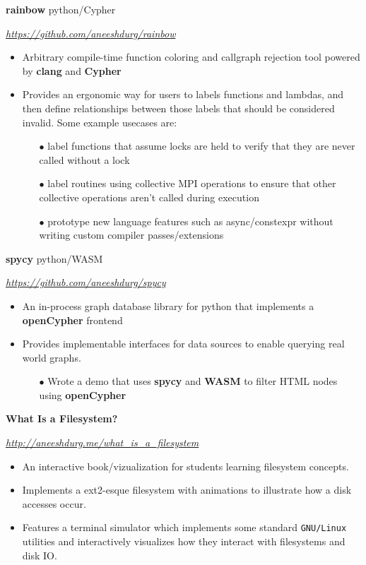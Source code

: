 \documentclass[paper=a4,fontsize=11pt]{scrartcl} %
\newcommand{\EducationEntry}[4]{
		\noindent \textbf{#1}     %
			\hfill#2 \par  %
		\noindent \textit{#3} \par        %
		\noindent\hangafter=0 \small #4 %
		\normalsize \par}
\begin{document}
\EducationEntry{rainbow}{python/Cypher}{\url{https://github.com/aneeshdurg/rainbow}}{
\begin{itemize}
  \item Arbitrary compile-time function coloring and callgraph rejection tool powered by \textbf{clang} and \textbf{Cypher}
\item Provides an ergonomic way for users to labels functions and lambdas, and then define relationships between those labels that should be considered invalid. Some example usecases are:
  \begin{itemize}
    \item[$\bullet$] label functions that assume locks are held to verify that they are never called without a lock
    \item[$\bullet$] label routines using collective MPI operations to ensure that other collective operations aren't called during execution
    \item[$\bullet$] prototype new language features such as async/constexpr without writing custom compiler passes/extensions
  \end{itemize}
\end{itemize}
}

\EducationEntry{spycy}{python/WASM}{\url{https://github.com/aneeshdurg/spycy}}{
\begin{itemize}
  \item An in-process graph database library for python that implements a \textbf{openCypher} frontend
  \item Provides implementable interfaces for data sources to enable querying real world graphs.
  \begin{itemize}
    \item[$\bullet$] Wrote a demo that uses \textbf{spycy} and \textbf{WASM} to filter HTML nodes using \textbf{openCypher}
  \end{itemize}
\end{itemize}
}

\EducationEntry{What Is a Filesystem?}{}{\url{http://aneeshdurg.me/what_is_a_filesystem}}{
\begin{itemize}
\item An interactive book/vizualization for students learning filesystem concepts.
\item Implements a ext2-esque filesystem with animations to illustrate how a disk accesses occur.
\item Features a terminal simulator which implements some standard \texttt{GNU/Linux} utilities and interactively visualizes how they interact with filesystems and disk IO.%
\end{itemize}
}
\end{document}
